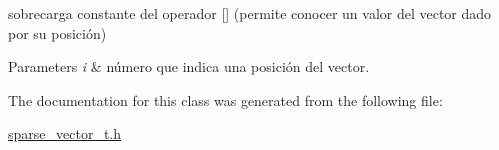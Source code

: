 sobrecarga constante del operador \mbox{[}\mbox{]} (permite conocer un valor del vector dado por su posición) 


\begin{DoxyParams}{Parameters}
{\em i} & número que indica una posición del vector. \\
\hline
\end{DoxyParams}


The documentation for this class was generated from the following file\+:\begin{DoxyCompactItemize}
\item 
\hyperlink{sparse__vector__t_8h}{sparse\+\_\+vector\+\_\+t.\+h}\end{DoxyCompactItemize}
